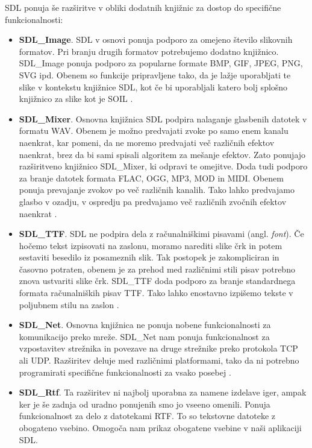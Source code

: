 \documentclass[12pt,a4paper,twoside]{book}
\begin{document}
SDL ponuja še razširitve v obliki dodatnih knjižnic za dostop do specifične funkcionalnosti:
\begin{itemize}
	\item \textbf{SDL\_Image}. SDL v osnovi ponuja podporo za omejeno število slikovnih formatov. Pri branju drugih formatov potrebujemo dodatno knjižnico. SDL\_Image ponuja podporo za popularne formate BMP, GIF, JPEG, PNG, SVG ipd. Obenem so funkcije pripravljene tako, da je lažje uporabljati te slike v kontekstu knjižnice SDL, kot če bi uporabljali katero bolj splošno knjižnico za slike kot je SOIL \cite{sdlimage}.
	\item \textbf{SDL\_Mixer}. Osnovna knjižnica SDL podpira nalaganje glasbenih datotek v formatu WAV. Obenem je možno predvajati zvoke po samo enem kanalu naenkrat, kar pomeni, da ne moremo predvajati več različnih efektov naenkrat, brez da bi sami spisali algoritem za mešanje efektov. Zato ponujajo razširitveno knjižnico SDL\_Mixer, ki odpravi te omejitve. Doda tudi podporo za branje datotek formata FLAC, OGG, MP3, MOD in MIDI. Obenem ponuja prevajanje zvokov po več različnih kanalih. Tako lahko predvajamo glasbo v ozadju, v ospredju pa predvajamo več različnih zvočnih efektov naenkrat \cite{sdlmixer}.
	\item \textbf{SDL\_TTF}. SDL ne podpira dela z računalniškimi pisavami (angl. \textit{font}). Če hočemo tekst izpisovati na zaslonu, moramo narediti slike črk in potem sestaviti besedilo iz posameznih slik. Tak postopek je zakompliciran in časovno potraten, obenem je za prehod med različnimi stili pisav potrebno znova ustvariti slike črk. SDL\_TTF doda podporo za branje standardnega formata računalniških pisav TTF. Tako lahko enostavno izpišemo tekste v poljubnem stilu na zaslon \cite{sdlttf}.
	\item \textbf{SDL\_Net}. Osnovna knjižnica ne ponuja nobene funkcionalnosti za komunikacijo preko mreže. SDL\_Net nam ponuja funkcionalnost za vzpostavitev strežnika in povezave na druge strežnike preko protokola TCP ali UDP. Razširitev deluje med različnimi platformami, tako da ni potrebno programirati specifične funkcionalnosti za vsako posebej \cite{sdlnet}.
	\item \textbf{SDL\_Rtf}. Ta razširitev ni najbolj uporabna za namene izdelave iger, ampak ker je še zadnja od uradno ponujenih smo jo vseeno omenili. Ponuja funkcionalnost za delo z datotekami RTF. To so tekstovne datoteke z obogateno vsebino. Omogoča nam prikaz obogatene vsebine v naši aplikaciji SDL.
\end{itemize}
\end{document}
